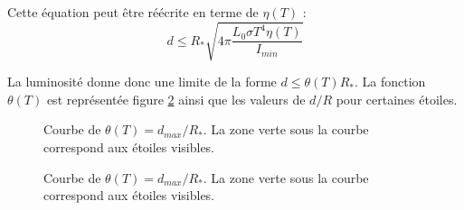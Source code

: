 \documentclass[11pt]{article} %
\begin{document}
Cette équation peut être réécrite en terme de $\eta(T)$ :
\begin{equation}
 d \leq R_{*} \sqrt{4\pi\dfrac{L_0 \sigma T^4 \eta(T)}{I_{min}}}
\end{equation}

La luminosité donne donc une limite de la forme $d \leq \theta (T) R_*$. La fonction $\theta(T)$ est représentée figure \ref{fig:theta} ainsi que les valeurs de $d/R$ pour certaines étoiles. 

\begin{figure}[H]
\centering
  \caption{Courbe de $\theta(T) =  d_{max}/R_*$. La zone verte sous la courbe correspond aux étoiles visibles.  
\label{fig:theta}}

\end{figure}


\begin{figure}[H]
\centering
  \caption{Courbe de $\theta(T) =  d_{max}/R_* $. La zone verte sous la courbe correspond aux étoiles visibles.  
\label{fig:theta}}

\end{figure}

%
%
\end{document}
